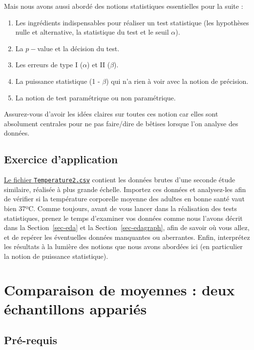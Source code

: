 \documentclass[
  french,
  a4paper,
  DIV=11,
  numbers=noendperiod,
  oneside]{scrreprt}
\providecommand{\tightlist}{%
  \setlength{\itemsep}{0pt}\setlength{\parskip}{0pt}}
\begin{document}
Mais nous avons aussi abordé des notions statistiques essentielles pour
la suite :

\begin{enumerate}
\def\labelenumi{\arabic{enumi}.}
\tightlist
\item
  Les ingrédients indispensables pour réaliser un test statistique (les
  hypothèses nulle et alternative, la statistique du test et le seuil
  \(\alpha\)).
\item
  La \(p-\)value et la décision du test.
\item
  Les erreurs de type I (\(\alpha\)) et II (\(\beta\)).
\item
  La puissance statistique (1 - \(\beta\)) qui n'a rien à voir avec la
  notion de précision.
\item
  La notion de test paramétrique ou non paramétrique.
\end{enumerate}

Assurez-vous d'avoir les idées claires sur toutes ces notion car elles
sont absolument centrales pour ne pas faire/dire de bêtises lorsque l'on
analyse des données.

\section{Exercice d'application}\label{sec-exo1}

\href{data/Temperature2.csv}{Le fichier \texttt{Temperature2.csv}}
contient les données brutes d'une seconde étude similaire, réalisée à
plus grande échelle. Importez ces données et analysez-les afin de
vérifier si la température corporelle moyenne des adultes en bonne santé
vaut bien 37ºC. Comme toujours, avant de vous lancer dans la réalisation
des tests statistiques, prenez le temps d'examiner vos données comme
nous l'avons décrit dans la Section~\ref{sec-eda} et la
Section~\ref{sec-edagraph}, afin de savoir où vous allez, et de repérer
les éventuelles données manquantes ou aberrantes. Enfin, interprétez les
résultats à la lumière des notions que nous avons abordées ici (en
particulier la notion de puissance statistique).


\chapter{Comparaison de moyennes : deux échantillons
appariés}\label{sec-moy2}

\section{Pré-requis}\label{sec-packages2}
\end{document}
